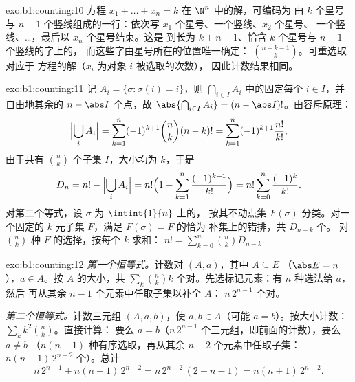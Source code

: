\begin{solution}{exo:b1:counting:10}
方程 $x_1 + \dots + x_n = k$ 在 $\N^n$ 中的解，可编码为
由 $k$ 个星号与 $n - 1$ 个竖线组成的一行：依次写 $x_1$ 个星号、一个竖线、$x_2$ 个星号、
一个竖线、\dots，最后以 $x_n$ 个星号结束。这是
到长为 $k + n - 1$、恰含 $k$ 个星号与 $n - 1$ 个竖线的字上的，
而这些字由星号所在的位置唯一确定：
$\binom{n + k - 1}{k}$。可重选取对应于
方程的解（$x_i$ 为对象 $i$ 被选取的次数），
因此计数结果相同。
\end{solution}

\begin{solution}{exo:b1:counting:11}
记 $A_i = \{\sigma : \sigma(i) = i\}$，则
$\bigcap_{i \in I} A_i$ 中的固定每个 $i \in I$，并自由地其余的
$n - \abs I$ 个点，故 $\abs{\bigcap_{i \in I} A_i} =
(n - \abs I)!$。由容斥原理：
\[
\Bigl|\bigcup_i A_i\Bigr|
= \sum_{k=1}^{n} (-1)^{k+1} \binom nk (n-k)!
= \sum_{k=1}^{n} (-1)^{k+1} \frac{n!}{k!} ,
\]
由于共有 $\binom nk$ 个子集 $I$，大小均为 $k$，于是
\[
D_n = n! - \Bigl|\bigcup_i A_i\Bigr|
= n!\Bigl(1 - \sum_{k=1}^{n} \frac{(-1)^{k+1}}{k!}\Bigr)
= n! \sum_{k=0}^{n} \frac{(-1)^k}{k!} .
\]
对第二个等式，设 $\sigma$ 为 $\intint{1}{n}$ 上的，
按其不动点集 $F(\sigma)$ 分类。对一个固定的
$k$ 元子集 $F$，满足 $F(\sigma) = F$ 的恰为
补集上的错排，共 $D_{n-k}$ 个。
对 $\binom nk$ 种 $F$ 的选择，按每个 $k$ 求和：
$n! = \sum_{k=0}^{n} \binom nk D_{n-k}$.
\end{solution}

\begin{solution}{exo:b1:counting:12}
\emph{第一个恒等式。}计数对 $(A, a)$，其中 $A \subseteq E$
（$\abs E = n$），$a \in A$。按 $A$ 的大小，共 $\sum_k \binom nk k$
个对。先选标记元素：有 $n$ 种选法给 $a$，然后
再从其余 $n - 1$ 个元素中任取子集以补全 $A$：
$n\,2^{n-1}$ 个对。

\emph{第二个恒等式。}计数三元组 $(A, a, b)$，使 $a, b \in
A$（可能 $a = b$）。按大小计数：$\sum_k k^2 \binom nk$。直接计算：
要么 $a = b$（$n\,2^{n-1}$ 个三元组，即前面的计数），要么 $a \neq b$
（$n(n-1)$ 种有序选取，再从其余 $n - 2$
个元素中任取子集：$n(n-1)\,2^{n-2}$ 个）。总计
\[
n\,2^{n-1} + n(n-1)\,2^{n-2} = n\,2^{n-2}\,(2 + n - 1)
= n(n+1)\,2^{n-2} .
\]
\end{solution}

